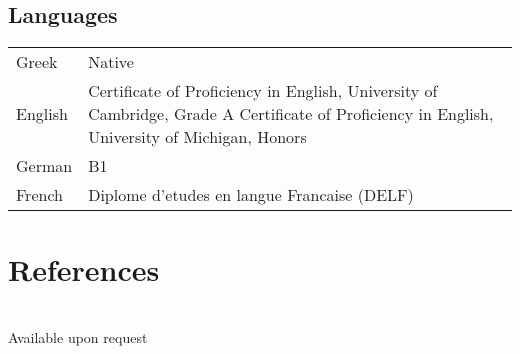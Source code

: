 \documentclass{article}
\begin{document}
	\subsection*{Languages}
		\begin{tabular}{p{2cm}  p{12cm}}
			Greek & Native \\
			English & Certificate of Proficiency in English, University of Cambridge, Grade A \newline
							Certificate of Proficiency in English, University of Michigan, Honors \\
			German & B1 \\
			French & Diplome d’etudes en langue Francaise (DELF) 
		\end{tabular}

	\section*{\color{NavyBlue}References}
	\vspace{-0.5cm}
	{\color{NavyBlue}\hrulefill} \\
	Available upon request
\end{document}
